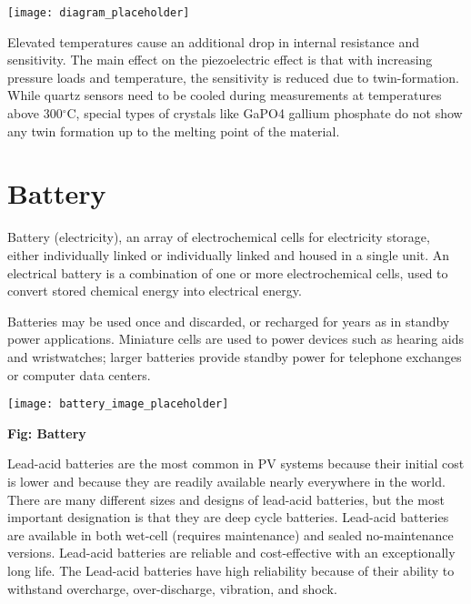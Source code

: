 \documentclass[12pt]{article}
\begin{document}
\texttt{[image: diagram\_placeholder]} %

Elevated temperatures cause an additional drop in internal resistance and sensitivity. The main effect on the piezoelectric effect is that with increasing pressure loads and temperature, the sensitivity is reduced due to twin-formation. While quartz sensors need to be cooled during measurements at temperatures above 300$^\circ$C, special types of crystals like GaPO4 gallium phosphate do not show any twin formation up to the melting point of the material.

\section*{Battery}

Battery (electricity), an array of electrochemical cells for electricity storage, either individually linked or individually linked and housed in a single unit. An electrical battery is a combination of one or more electrochemical cells, used to convert stored chemical energy into electrical energy.
\newpage 


Batteries may be used once and discarded, or recharged for years as in standby power applications. Miniature cells are used to power devices such as hearing aids and wristwatches; larger batteries provide standby power for telephone exchanges or computer data centers.

\begin{center}
    \texttt{[image: battery\_image\_placeholder]} %
\end{center}

\begin{center}
    \textbf{Fig: Battery}
\end{center}

Lead-acid batteries are the most common in PV systems because their initial cost is lower and because they are readily available nearly everywhere in the world. There are many different sizes and designs of lead-acid batteries, but the most important designation is that they are deep cycle batteries. Lead-acid batteries are available in both wet-cell (requires maintenance) and sealed no-maintenance versions. Lead-acid batteries are reliable and cost-effective with an exceptionally long life. The Lead-acid batteries have high reliability because of their ability to withstand overcharge, over-discharge, vibration, and shock.
\end{document}
